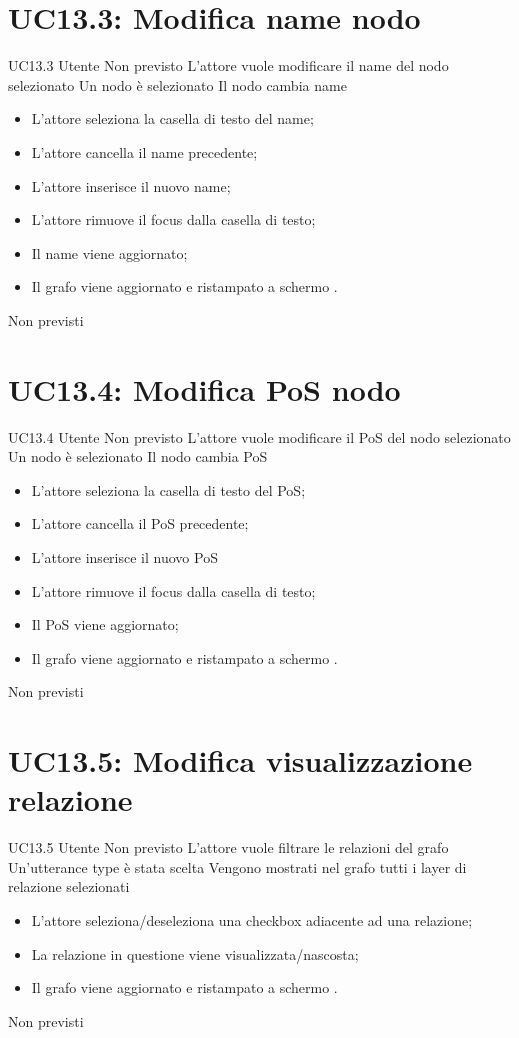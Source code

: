 \documentclass[../AnalisideiRequisiti.tex]{subfiles}
\begin{document}
\section{UC13.3: Modifica name nodo}
\UserCase
{UC13.3}
{Utente}
{Non previsto}
{L'attore vuole modificare il name del nodo selezionato}
{Un nodo è selezionato }
{Il nodo cambia name}
{
	\begin{itemize}
		\item{} L'attore seleziona la casella di testo del name;
		\item{} L'attore cancella il name precedente;
		\item{} L'attore inserisce il nuovo name;
		\item{} L'attore rimuove il focus dalla casella di testo;
		\item{} Il name viene aggiornato;
		\item{} Il grafo viene aggiornato e ristampato a schermo .
	\end{itemize}
}
{Non previsti}

\section{UC13.4: Modifica PoS nodo}
\UserCase
{UC13.4}
{Utente}
{Non previsto}
{L'attore vuole modificare il PoS del nodo selezionato}
{Un nodo è selezionato }
{Il nodo cambia PoS}
{
	\begin{itemize}
		\item{} L'attore seleziona la casella di testo del PoS;
		\item{} L'attore cancella il PoS precedente;
		\item{} L'attore inserisce il nuovo PoS
		\item{} L'attore rimuove il focus dalla casella di testo;
		\item{} Il PoS viene aggiornato;
		\item{} Il grafo viene aggiornato e ristampato a schermo .
	\end{itemize}
}
{Non previsti}

\section{UC13.5: Modifica visualizzazione relazione}
\UserCase
{UC13.5}
{Utente}
{Non previsto}
{L'attore vuole filtrare le relazioni del grafo}
{Un'utterance type è stata scelta }
{Vengono mostrati nel grafo tutti i layer di relazione selezionati}
{
	\begin{itemize}
		\item{} L'attore seleziona/deseleziona una checkbox adiacente ad una relazione;
		\item{} La relazione in questione viene visualizzata/nascosta;
		\item{} Il grafo viene aggiornato e ristampato a schermo .
	\end{itemize}
}
{Non previsti}
\end{document}
